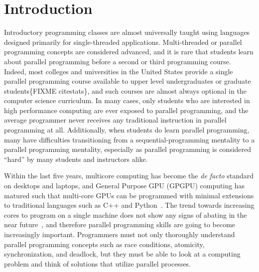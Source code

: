 \documentclass{sig-alternate}
\newcommand{\FIXME}[1]{{\color{red}\{FIXME #1\}}}
\begin{document}
\section{Introduction}
Introductory programming classes are almost universally taught 
using languages designed primarily for single-threaded applications.  Multi-threaded or
parallel programming concepts are considered advanced, and it is rare that students learn about
parallel programming before a second or third programming course.  Indeed, most colleges and
universities in the United States provide a single parallel programming course available 
to upper level undergraduates or graduate students\FIXME{citestats}, and such courses are
almost always optional in the computer science curriculum.  In many cases, only students who
are interested in high performance computing are ever exposed to parallel programming, and the
average programmer never receives any traditional instruction in parallel programming at all.
Additionally, when students do learn parallel programming, many have difficulties transitioning
from a sequential-programming mentality to a parallel programming mentality, especially as parallel
programming is considered ``hard'' by many students and instructors 
alike.~\cite{parallelExpectations}

Within the last five years, multicore computing has become the \emph{de facto} standard on
desktops and laptops, and General Purpose GPU (GPGPU) computing has matured such that multi-core 
GPUs can be programmed with minimal extensions to traditional languages such as C++ and 
Python~\cite{gpgpuLanguages}.  The trend towards increasing cores to program on a
single machine does not show any signs of abating in the near future~\cite{multicoreTrends}, and
therefore parallel programming skills are going to become increasingly important.  Programmers
must not only thoroughly understand parallel programming concepts such as race conditions,
atomicity, synchronization, and deadlock, but they must be able to look at a computing problem
and think of solutions that utilize parallel processes.
\end{document}
